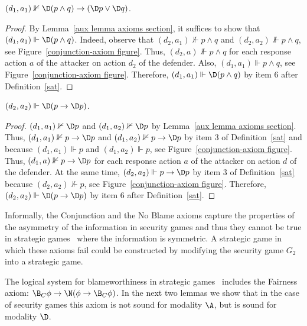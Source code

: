 \documentclass[letterpaper]{article}
\begin{document}
\begin{lemma}\label{conjunction lemma axioms section}
$(d_1,a_1)\nVdash \D(p\wedge q)\to(\D p\vee\D q)$.
\end{lemma}
\begin{proof}
By Lemma~\ref{aux lemma axioms section}, it suffices to show that $(d_1,a_1)\Vdash \D(p\wedge q)$. Indeed, observe that $(d_2,a_1)\nVdash p\wedge q$ and $(d_2,a_2)\nVdash p\wedge q$, see Figure~\ref{conjunction-axiom figure}. Thus, $(d_2,a)\nVdash p\wedge q$ for each response action $a$ of the attacker on action $d_2$ of the defender. Also, $(d_1,a_1)\Vdash p\wedge q$, see Figure~\ref{conjunction-axiom figure}. Therefore, $(d_1,a_1)\Vdash \D(p\wedge q)$ by item 6 after Definition~\ref{sat}.
\end{proof}


\begin{lemma}\label{no blame lemma axioms section}
$(d_2,a_2)\Vdash \D(p\to\D p)$.
\end{lemma}
\begin{proof}
$(d_1,a_1)\nVdash \D p$ and $(d_1,a_2)\nVdash \D p$ by Lemma~\ref{aux lemma axioms section}. Thus, $(d_1,a_1)\nVdash p\to \D p$ and $(d_1,a_2)\nVdash p\to \D p$ by item 3 of Definition~\ref{sat} and because $(d_1,a_1)\Vdash p$ and $(d_1,a_2)\Vdash p$, see Figure~\ref{conjunction-axiom figure}. Thus, $(d_1,a)\nVdash p\to \D p$ for each response action $a$ of the attacker on action $d$ of the defender. At the same time, $(d_2,a_2)\Vdash p\to\D p$ by item 3 of Definition~\ref{sat} because $(d_2,a_2)\nVdash p$, see Figure~\ref{conjunction-axiom figure}. Therefore, $(d_2,a_2)\Vdash \D(p\to\D p)$ by item 6 after Definition~\ref{sat}.
\end{proof}

Informally, the Conjunction and the No Blame axioms capture the properties of the asymmetry of the information in security games and thus they cannot be true in strategic games~\cite{nt19aaai} where the information is symmetric. A strategic game in which these axioms fail could be constructed by modifying the security game $G_2$ into a strategic game. 

The logical system for blameworthiness in strategic games~\cite{nt19aaai} includes the Fairness axiom: $\B_C\phi\to\N(\phi\to\B_C\phi)$. In the next two lemmas we show that in the case of security games this axiom is not sound for modality $\A$, but is sound for modality $\D$.
\end{document}
